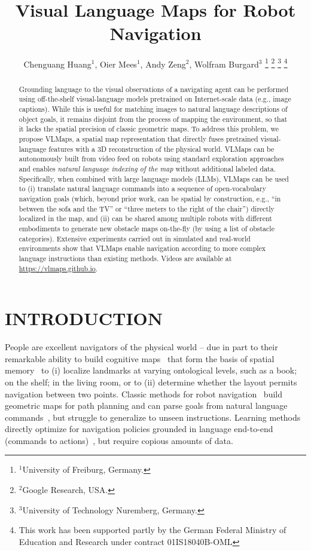 \documentclass[letterpaper, 10 pt, conference]{ieeeconf}  %
\title{\LARGE \bf
\ \ \\
\ \ \\
Visual Language Maps for Robot Navigation
\vspace{0.75em}
}
\author{Chenguang Huang$^{1}$, Oier Mees$^{1}$, Andy Zeng$^{2}$, Wolfram Burgard$^{3}$%
\thanks{$^{1}$University of Freiburg, Germany.}%
\thanks{$^{2}$Google Research, USA.}%
\thanks{$^{3}$University of Technology Nuremberg, Germany.}%
\thanks{This work has been supported partly by the German Federal Ministry of Education and Research under contract 01IS18040B-OML}%
\vspace{-3em}%
}
\date{}
\newcommand{\eg}{e.g., }
\begin{document}
\maketitle
\thispagestyle{empty}
\pagestyle{empty}


\begin{abstract}

Grounding language to the visual observations of a navigating agent can be performed using off-the-shelf visual-language models pretrained on Internet-scale data (\eg image captions). While this is useful for matching images to natural language descriptions of object goals, it remains disjoint from the process of mapping the environment, so that it lacks the spatial precision of classic geometric maps.
To address this problem, we propose VLMaps, a spatial map representation that directly fuses pretrained visual-language features with a 3D reconstruction of the physical world. VLMaps can be autonomously built from video feed on robots using standard exploration approaches and enables \emph{natural language indexing of the map} without additional labeled data.
Specifically, when combined with large language models (LLMs), VLMaps can be used to (i) translate natural language commands into a sequence of open-vocabulary navigation goals (which, beyond prior work, can be spatial by construction, \eg ``in between the sofa and the TV'' or ``three meters to the right of the chair'') directly localized in the map, and (ii) can be shared among multiple robots with different embodiments to generate new obstacle maps on-the-fly (by using a list of obstacle categories).
Extensive experiments carried out in simulated and real-world environments show that VLMaps enable navigation according to more complex language instructions than existing methods. Videos are available at \href{https://vlmaps.github.io}{https://vlmaps.github.io}.

\end{abstract}


\section{INTRODUCTION}

People are excellent navigators of the physical world -- due in part to their remarkable ability to build cognitive maps~\cite{mcnamara1989subjective} that form the basis of spatial memory~\cite{chun1998contextual,newman2007learning} to (i) localize landmarks at varying ontological levels, such as a book; on the shelf; in the living room, or to (ii) determine whether the layout permits navigation between two points. Classic methods for robot navigation~\cite{thrun1998probabilistic, endres2012evaluation} build geometric maps for path planning and can parse goals from natural language commands~\cite{tellex2011understanding, macmahon2006walk}, but struggle to generalize to unseen instructions. Learning methods directly optimize for navigation policies grounded in language end-to-end (commands to actions)~\cite{anderson2018vision, anderson2021sim}, but require copious amounts of data.
\end{document}
